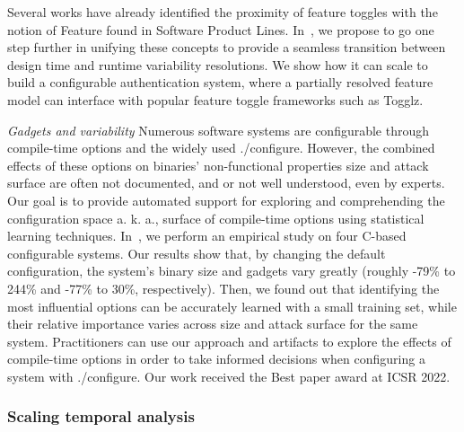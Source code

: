 Several works have already identified the proximity of feature toggles with the notion of Feature found in Software Product Lines. In~\cite{jezequel:hal-03788437}, we propose to go one step further in unifying these concepts to provide a seamless transition between design time and runtime variability resolutions. 
We show how it can scale to build a configurable authentication system, where a partially resolved feature model can interface with popular feature toggle frameworks such as Togglz.


\emph{Gadgets and variability} Numerous software systems are configurable through compile-time options and the widely used ./configure. However, the combined effects of these options on binaries' non-functional properties size and attack surface are often not documented, and or not well understood, even by experts. Our goal is to provide automated support for exploring and comprehending the configuration space a. k. a., surface of compile-time options using statistical learning techniques. In~\cite{ternava:hal-03627246}, we perform an empirical study on four C-based configurable systems. Our results show that, by changing the default configuration, the system's binary size and gadgets vary greatly (roughly -79\% to 244\% and -77\% to 30\%, respectively). Then, we found out that identifying the most influential options can be accurately learned with a small training set, while their relative importance varies across size and attack surface for the same system. Practitioners can use our approach and artifacts to explore the effects of compile-time options in order to take informed decisions when configuring a system with ./configure. Our work received the Best paper award at ICSR 2022.

\subsubsection{Scaling temporal analysis}

